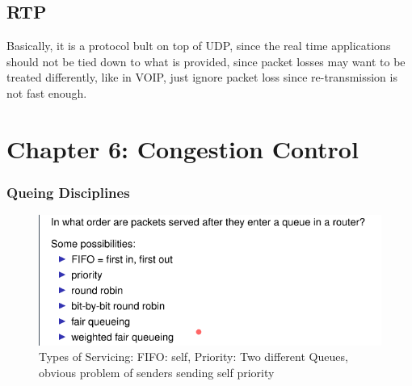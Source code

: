 \documentclass[12pt]{book}
\begin{document}
\section{RTP}
Basically, it is a protocol bult on top of UDP, since the real time applications should not be tied down to what is provided, since packet losses may want to be treated differently, like in VOIP, just ignore packet loss since re-transmission is not fast enough.

\chapter{Chapter 6: Congestion Control}

\subsection{Queing Disciplines}
\begin{figure}[H]
    \centering
    \includegraphics{Pictures/Queues.png}
    \caption{Types of Servicing: FIFO: self, Priority: Two different Queues, obvious problem of senders sending self priority}
    \label{fig:my_label}
\end{figure}
\end{document}
